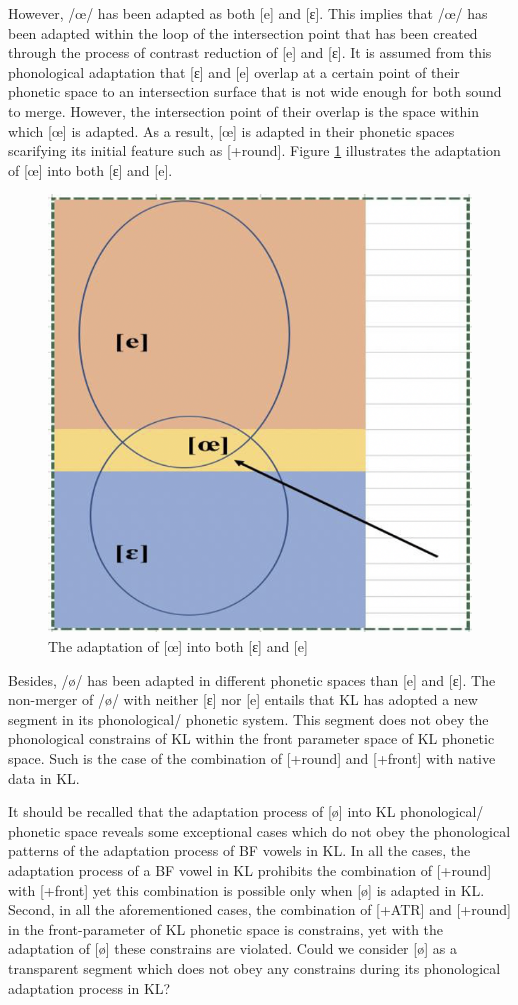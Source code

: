 \documentclass[output=paper]{langscibook}
\begin{document}
However, /œ/ has been adapted as both [e] and [ɛ]. This implies that /œ/ has been adapted within the loop of the intersection point that has been created through the process of contrast reduction of [e] and [ɛ]. It is assumed from this phonological adaptation that [ɛ] and [e] overlap at a certain point of their phonetic space to an intersection surface that is not wide enough for both sound to merge. However, the intersection point of their overlap is the space within which [œ] is adapted. As a result, [œ] is adapted in their phonetic spaces scarifying its initial feature such as [+round]. Figure \ref{fig:1} illustrates the adaptation of [œ] into both [ɛ] and [e].


\begin{figure}
    \includegraphics[width=.5\textwidth]{figures/kabasele-figure1.png}
    \caption{The adaptation of [œ] into both [ɛ] and [e]}
    \label{fig:1}
\end{figure}

Besides, /ø/ has been adapted in different phonetic spaces than [e] and [ɛ]. The non-merger of /ø/ with neither [ɛ] nor [e] entails that KL has adopted a new segment in its phonological/ phonetic system. This segment does not obey the phonological constrains of KL within the front parameter space of KL phonetic space. Such is the case of the combination of [+round] and [+front] with native data in KL.

It should be recalled that the adaptation process of [ø] into KL phonological/ phonetic space reveals some exceptional cases which do not obey the phonological patterns of the adaptation process of BF vowels in KL. In all the cases, the adaptation process of a BF vowel in KL prohibits the combination of [+round] with [+front] yet this combination is possible only when [ø] is adapted in KL. Second, in all the aforementioned cases, the combination of [+ATR] and [+round] in the front-parameter of KL phonetic space is constrains, yet with the adaptation of [ø] these constrains are violated. Could we consider [ø] as a transparent segment which does not obey any constrains during its phonological adaptation process in KL?
\end{document}
